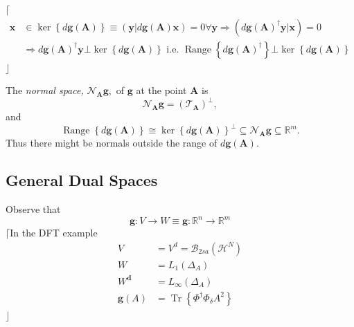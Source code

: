 \documentclass[aps,preprint]{revtex4}%
\begin{document}
$\lceil$%
\begin{align}
\mathbf{x}  &  \mathbf{\in}\ker\left\{  d\boldsymbol{g}\left(  \boldsymbol{A}%
\right)  \right\}  \equiv\left(  \mathbf{y}\left\vert d\boldsymbol{g}\left(
\boldsymbol{A}\right)  \mathbf{x}\right.  \right)  =0\forall
\mathbf{y\Rightarrow}\left(  d\boldsymbol{g}\left(  \boldsymbol{A}\right)
^{\dagger}\mathbf{y}\left\vert \mathbf{x}\right.  \right)  =0\nonumber\\
&  \Rightarrow d\boldsymbol{g}\left(  \boldsymbol{A}\right)  ^{\dagger
}\mathbf{y\bot}\ker\left\{  d\boldsymbol{g}\left(  \boldsymbol{A}\right)
\right\}  \text{ i.e. }\operatorname*{Range}\left\{  d\boldsymbol{g}\left(
\boldsymbol{A}\right)  ^{\dagger}\right\}  \mathbf{\bot}\ker\left\{
d\boldsymbol{g}\left(  \boldsymbol{A}\right)  \right\}
\end{align}
$\rfloor$

The \emph{normal space, }$\mathcal{N}_{\boldsymbol{A}}\boldsymbol{g},$ of
$\boldsymbol{g}$ at the point $\boldsymbol{A}$ is%
\[
\mathcal{N}_{\boldsymbol{A}}\boldsymbol{g}=\left(  \mathcal{T}_{\boldsymbol{A}%
}\right)  ^{\bot},
\]
and
\begin{equation}
\operatorname*{Range}\left\{  d\boldsymbol{g}\left(  \boldsymbol{A}\right)
\right\}  \cong\ker\left\{  d\boldsymbol{g}\left(  \boldsymbol{A}\right)
\right\}  ^{\bot}\subseteq\mathcal{N}_{\boldsymbol{A}}\boldsymbol{g}%
\subseteq\mathbb{R}^{m}.
\end{equation}
Thus there might be normals outside the range of $d\boldsymbol{g}\left(
\boldsymbol{A}\right)  $.

\subsection{General Dual Spaces}

Observe that
\[
\boldsymbol{g}:V\longrightarrow W\equiv\boldsymbol{g}:\mathbb{R}%
^{n}\longrightarrow\mathbb{R}^{m}%
\]
$\lceil$In the DFT example
\begin{align}
V  &  =V^{d}=\mathcal{B}_{2sa}\left(  \mathcal{H}^{N}\right) \\
W  &  =L_{1}\left(  \Delta_{A}\right) \\
W^{\boldsymbol{d}}  &  =L_{\infty}\left(  \Delta_{A}\right) \\
\boldsymbol{g}\left(  A\right)   &  =\operatorname{Tr}\left\{  \Phi^{\dagger
}\Phi_{\delta}A^{2}\right\}
\end{align}
$\rfloor$
\end{document}
